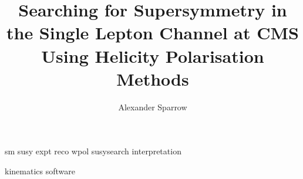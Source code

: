\documentclass{mythesis}
\title{Searching for Supersymmetry in the Single Lepton Channel at CMS Using Helicity Polarisation Methods} \author{Alexander Sparrow}
\begin{document}


\begin{frontmatter}
  
\end{frontmatter}
\begin{mainmatter}
  \linenumbers
  {sm}
  {susy}
  {expt}
  {reco}
  {wpol}
  {susysearch}
  {interpretation}

  \nolinenumbers
\end{mainmatter}

\begin{comment}
  
  
  
  
  
  
  
\end{comment}

\begin{appendices}
  {kinematics}
  {software}
\end{appendices}

\begin{comment}
  
\end{comment}

\begin{backmatter}
  
\end{backmatter}

\end{document}

